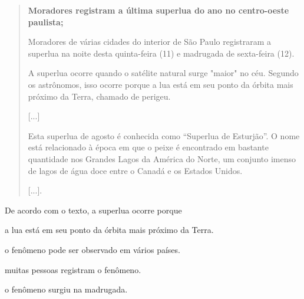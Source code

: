 \begin{quote}
\textbf{Moradores registram a última superlua do ano no centro-oeste
paulista;}

Moradores de várias cidades do interior de São Paulo registraram a
superlua na noite desta quinta-feira (11) e madrugada de sexta-feira
(12).

A superlua ocorre quando o satélite natural surge "maior" no céu.
Segundo os astrônomos, isso ocorre porque a lua está em seu ponto da
órbita mais próximo da Terra, chamado de perigeu.

{[}...{]}

Esta superlua de agosto é conhecida como ``Superlua de Esturjão''. O
nome está relacionado à época em que o peixe é encontrado em bastante
quantidade nos Grandes Lagos da América do Norte, um conjunto imenso de
lagos de água doce entre o Canadá e os Estados Unidos.

{[}...{]}.

\end{quote}

De acordo com o texto, a superlua ocorre porque

\begin{escolha}
\item a lua está em seu ponto da órbita mais próximo da Terra.

\item o fenômeno pode ser observado em vários países.

\item muitas pessoas registram o fenômeno.

\item o fenômeno surgiu na madrugada.
\end{escolha}



